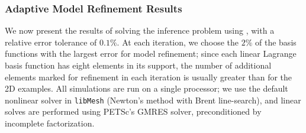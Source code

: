 \documentclass[review,sort&compress]{elsarticle}
\theoremstyle{plain} %
\theoremstyle{definition} %
\begin{document}
\subsubsection{Adaptive Model Refinement Results} \label{sec:ref3D_diffmesh}

We now present the results of solving the inference problem using , with a relative error tolerance of $0.1\%$. At each iteration, we choose the $2\%$ of the basis functions with the largest error for model refinement; since each linear Lagrange basis function has eight elements in its support, the number of additional elements marked for refinement in each iteration is usually greater than for the 2D examples. All simulations are run on a single processor; we use the default nonlinear solver in \texttt{libMesh} \cite{libMeshPaper} (Newton's method with Brent line-search), and linear solves are performed using PETSc's \cite{petsc-user-ref} GMRES solver, preconditioned by incomplete factorization.
\end{document}
